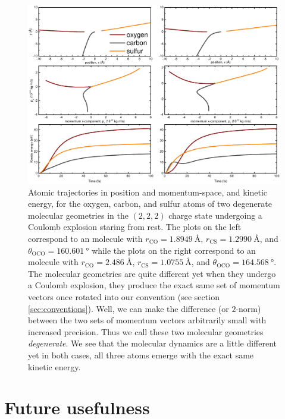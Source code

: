 \begin{figure}
  \centering
  \includegraphics[width=\textwidth]{Plots/DegenerateGeometryTrajectories.pdf}
  \caption[Atomic trajectories in position and momentum-space, and kinetic energy, of two degenerate molecular geometries undergoing a Coulomb explosion.]
  {Atomic trajectories in position and momentum-space, and kinetic energy, for the oxygen, carbon, and sulfur atoms of two degenerate  molecular geometries in the $(2,2,2)$ charge state undergoing a Coulomb explosion staring from rest. The plots on the left correspond to an  molecule with $r_\textrm{CO} = \SI{1.8949}{\angstrom}$, $r_\textrm{CS} = \SI{1.2990}{\angstrom}$, and $\theta_\mathrm{OCO} = \SI{160.601}{\degree}$ while the plots on the right correspond to an  molecule with $r_\textrm{CO} = \SI{2.486}{\angstrom}$, $r_\textrm{CS} = \SI{1.0755}{\angstrom}$, and $\theta_\mathrm{OCO} = \SI{164.568}{\degree}$. The molecular geometries are quite different yet when they undergo a Coulomb explosion, they produce the exact same set of momentum vectors once rotated into our convention (see section \ref{sec:conventions}). Well, we can make the difference (or $2$-norm) between the two sets of momentum vectors arbitrarily small with increased precision. Thus we call these two molecular geometries \emph{degenerate}. We see that the molecular dynamics are a little different yet in both cases, all three atoms emerge with the exact same kinetic energy.}
  \label{fig:DegenerateGeometryTrajectories}
\end{figure}
\clearpage

\section{Future usefulness}

